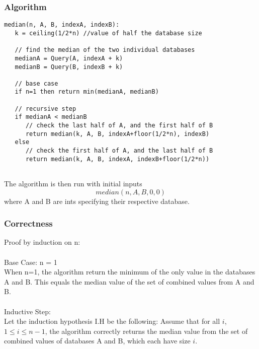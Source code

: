 \documentclass[12pt, oneside]{article}
\begin{document}
\subsubsection*{Algorithm}
\begin{verbatim}
median(n, A, B, indexA, indexB):
   k = ceiling(1/2*n) //value of half the database size
   
   // find the median of the two individual databases
   medianA = Query(A, indexA + k)
   medianB = Query(B, indexB + k)
   
   // base case
   if n=1 then return min(medianA, medianB)
   
   // recursive step
   if medianA < medianB
      // check the last half of A, and the first half of B
      return median(k, A, B, indexA+floor(1/2*n), indexB)
   else
      // check the first half of A, and the last half of B
      return median(k, A, B, indexA, indexB+floor(1/2*n))
      
\end{verbatim}
The algorithm is then run with initial inputs
\[median(n,A,B,0,0)\]
where A and B are ints specifying their respective database.
\subsubsection*{Correctness}
Proof by induction on n:\\\\
Base Case: n = 1\\
When n=1, the algorithm return the minimum of the only value in the databases A and B. This equals the median value of the set of combined values from A and B.\\\\
Inductive Step:\\ Let the induction hypothesis I.H be the following: Assume that for all $i$, $1 \leq i \leq n-1$, the algorithm correctly returns the median value from the set of combined values of databases A and B, which each have size $i$.\\
\end{document}
